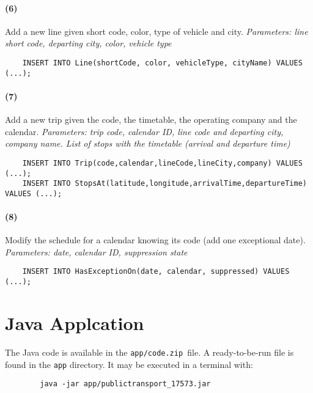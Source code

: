 	\paragraph{(6)} Add a new line given short code, color, type of vehicle and city. \textit{Parameters: line short code, departing city, color, vehicle type}
	\begin{center}
		\begin{lstlisting}
	INSERT INTO Line(shortCode, color, vehicleType, cityName) VALUES (...);
		\end{lstlisting}
	\end{center}

	\paragraph{(7)} Add a new trip given the code, the timetable, the operating company and the calendar. \textit{Parameters: trip code, calendar ID, line code and departing city, company name. List of stops with the timetable (arrival and departure time)}
	\begin{center}
		\begin{lstlisting}
	INSERT INTO Trip(code,calendar,lineCode,lineCity,company) VALUES (...);
	INSERT INTO StopsAt(latitude,longitude,arrivalTime,departureTime) VALUES (...);
		\end{lstlisting}
	\end{center}

	\paragraph{(8)} Modify the schedule for a calendar knowing its code (add one exceptional date). \textit{Parameters: date, calendar ID, suppression state}
	\begin{center}
		\begin{lstlisting}
	INSERT INTO HasExceptionOn(date, calendar, suppressed) VALUES (...);
		\end{lstlisting}
	\end{center}

\section{Java Applcation}

	The Java code is available in the \texttt{app/code.zip }file. A ready-to-be-run file is found in the \texttt{app} directory. It may be executed in a terminal with:
	\begin{center}
		\begin{lstlisting}
		java -jar app/publictransport_17573.jar
		\end{lstlisting}
	\end{center}

